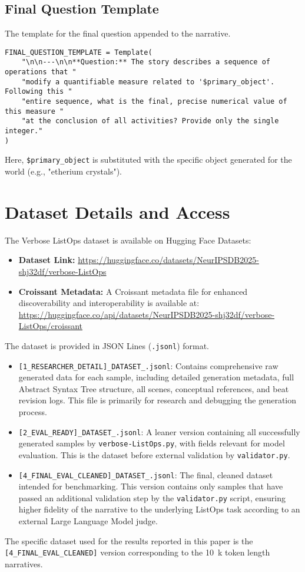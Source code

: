 \documentclass{article}
\begin{document}
\subsection{Final Question Template}
\label{app:prompts_final_question}
The template for the final question appended to the narrative.
\begin{verbatim}
FINAL_QUESTION_TEMPLATE = Template(
    "\n\n---\n\n**Question:** The story describes a sequence of operations that "
    "modify a quantifiable measure related to '$primary_object'. Following this "
    "entire sequence, what is the final, precise numerical value of this measure "
    "at the conclusion of all activities? Provide only the single integer."
)
\end{verbatim}
Here, \texttt{\$primary\_object} is substituted with the specific object generated for the world (e.g., "etherium crystals").

\section{Dataset Details and Access}
\label{app:dataset_details}
The Verbose ListOps dataset is available on Hugging Face Datasets:
\begin{itemize}
  \item \textbf{Dataset Link:} \url{https://huggingface.co/datasets/NeurIPSDB2025-shj32df/verbose-ListOps}
  \item \textbf{Croissant Metadata:} A Croissant metadata file for enhanced discoverability and interoperability is available at: \url{https://huggingface.co/api/datasets/NeurIPSDB2025-shj32df/verbose-ListOps/croissant}
\end{itemize}

The dataset is provided in JSON Lines (\texttt{.jsonl}) format.
\begin{itemize}
  \item \texttt{[1\_RESEARCHER\_DETAIL]\_DATASET\_\*.jsonl}: Contains comprehensive raw generated data for each sample, including detailed generation metadata, full Abstract Syntax Tree structure, all scenes, conceptual references, and beat revision logs. This file is primarily for research and debugging the generation process.
  \item \texttt{[2\_EVAL\_READY]\_DATASET\_\*.jsonl}: A leaner version containing all successfully generated samples by \texttt{verbose-ListOps.py}, with fields relevant for model evaluation. This is the dataset before external validation by \texttt{validator.py}.
  \item \texttt{[4\_FINAL\_EVAL\_CLEANED]\_DATASET\_\*.jsonl}: The final, cleaned dataset intended for benchmarking. This version contains only samples that have passed an additional validation step by the \texttt{validator.py} script, ensuring higher fidelity of the narrative to the underlying ListOps task according to an external Large Language Model judge.
\end{itemize}
The specific dataset used for the results reported in this paper is the \texttt{[4\_FINAL\_EVAL\_CLEANED]} version corresponding to the \SI{10}{k} token length narratives.
\end{document}
